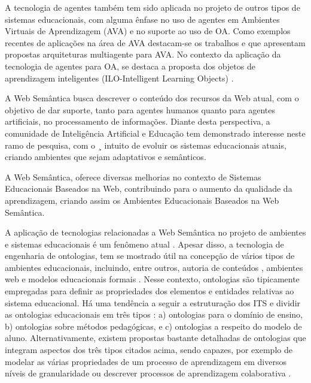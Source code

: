 A tecnologia de agentes também tem sido aplicada no projeto de outros tipos de sistemas educacionais, 
com alguma ênfase no uso de agentes em Ambientes Virtuais de Aprendizagem (AVA) e no suporte ao uso de OA. 
Como exemplos recentes de aplicações na área de AVA destacam-se os trabalhos \cite{Arias}  e \cite{Campana2008} que 
apresentam propostas arquiteturas multiagente para AVA. No contexto da aplicação da tecnologia de agentes para OA, 
se destaca a proposta dos objetos de aprendizagem inteligentes 
(ILO-Intelligent Learning Objects) \cite{Gomes2004} \cite{Bavaresco2009}.

A Web Semântica busca descrever o conteúdo dos recursos da Web atual, com o objetivo de dar suporte, 
tanto para agentes humanos quanto para agentes artificiais, no processamento de informações. 
Diante desta perspectiva, a comunidade de Inteligência Artificial e Educação tem demonstrado 
interesse neste ramo de pesquisa, com o ¸ intuito de evoluir os sistemas educacionais atuais,
criando ambientes que sejam adaptativos e semânticos.

A Web Semântica, oferece diversas melhorias no contexto de Sistemas Educacionais Baseados na Web, 
contribuindo para o aumento da qualidade da aprendizagem, criando assim os Ambientes Educacionais 
Baseados na Web Semântica.

A aplicação de tecnologias relacionadas a Web Semântica no projeto de ambientes e sistemas educacionais é um fenômeno atual \cite{Isotani} \cite{Proceedings2007}. Apesar disso, a tecnologia de engenharia de ontologias, 
tem se mostrado útil na concepção de vários tipos de ambientes educacionais, incluindo, entre outros, autoria 
de conteúdos \cite{Isotani} \cite{Isotani2008}, ambientes web \cite{Silva2009} \cite{Bittencourt2009} e 
modelos educacionais formais \cite{Hayashi2009}. Nesse contexto, ontologias são tipicamente empregadas para 
definir as propriedades dos elementos e entidades relativas ao sistema educacional. Há uma tendência a seguir 
a estruturação dos ITS e dividir as ontologias educacionais em três tipos \cite{Silva2009}: a) ontologias 
para o domínio de ensino, b) ontologias sobre métodos pedagógicas, e c) ontologias a respeito do modelo de aluno. 
Alternativamente, existem propostas bastante detalhadas de ontologias que integram aspectos dos três tipos citados acima, 
sendo capazes, por exemplo de modelar as várias propriedades de um processo de aprendizagem em diversos níveis de 
granularidade \cite{Proceedings2007} ou descrever processos de aprendizagem colaborativa \cite{Hayashi2009}.

